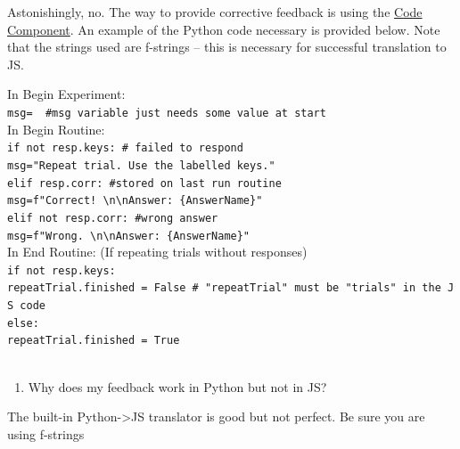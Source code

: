\documentclass[
]{book}
\providecommand{\tightlist}{%
  \setlength{\itemsep}{0pt}\setlength{\parskip}{0pt}}
\begin{document}
Astonishingly, no. The way to provide corrective feedback is using the \href{https://www.psychopy.org/builder/components/code.html}{Code Component}. An example of the Python code necessary is provided below. Note that the strings used are f-strings -- this is necessary for successful translation to JS.

In Begin Experiment:\\
\texttt{msg=\textquotesingle{}\textquotesingle{}\ \ \#msg\ variable\ just\ needs\ some\ value\ at\ start}~\\

In Begin Routine:\\
\texttt{if\ not\ resp.keys:\ \#\ failed\ to\ respond}~\\
\hspace*{0.333em} \texttt{msg="Repeat\ trial.\ Use\ the\ labelled\ keys."}\\
\texttt{elif\ resp.corr:\ \#stored\ on\ last\ run\ routine}~\\
\hspace*{0.333em} \texttt{msg=f"Correct!\ \textbackslash{}n\textbackslash{}nAnswer:\ \{AnswerName\}"}\\
\texttt{elif\ not\ resp.corr:\ \#wrong\ answer}~\\
\hspace*{0.333em} \texttt{msg=f"Wrong.\ \textbackslash{}n\textbackslash{}nAnswer:\ \{AnswerName\}"}\\

In End Routine: (If repeating trials without responses)\\
\texttt{if\ not\ resp.keys:}~\\
\hspace*{0.333em} \texttt{repeatTrial.finished\ =\ False\ \#\ "repeatTrial"\ must\ be\ "trials"\ in\ the\ JS\ code}\\
\texttt{else:}~\\
\hspace*{0.333em} \texttt{repeatTrial.finished\ =\ True}\\
~\\

\begin{enumerate}
\def\labelenumi{(\arabic{enumi})}
\setcounter{enumi}{3}
\tightlist
\item
  Why does my feedback work in Python but not in JS?
\end{enumerate}

The built-in Python-\textgreater JS translator is good but not perfect. Be sure you are using f-strings
\end{document}
